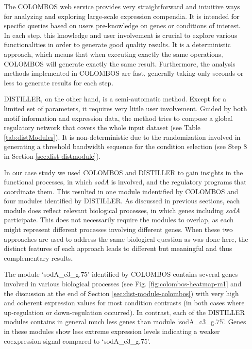 The COLOMBOS web service provides very straightforward and intuitive
ways for analyzing and exploring large-scale expression compendia. It is
intended for specific queries based on users pre-knowledge on genes or
conditions of interest. In each step, this knowledge and user
involvement is crucial to explore various functionalities in order to
generate good quality results. It is a deterministic approach, which
means that when executing exactly the same operations, COLOMBOS will
generate exactly the same result. Furthermore, the analysis methods
implemented in COLOMBOS are fast, generally taking only seconds or less
to generate results for each step.

DISTILLER, on the other hand, is a semi-automatic method. Except for a
limited set of parameters, it requires very little user 
involvement. Guided by both motif information and expression data, the
method tries to compose a global regulatory network that covers the
whole input dataset (see Table \ref{tab:distModules}). 
It is non-deterministic due to the
randomization involved in generating a threshold bandwidth sequence for
the condition selection (see Step 8 in Section \ref{sec:dist-distmodule}).

In our case study we used COLOMBOS and DISTILLER to gain insights in the
functional processes, in which \textit{sodA} is involved, and the regulatory
programs that coordinate them. This resulted in one module indentified
by COLOMBOS and four modules identified by DISTILLER. As discussed in
previous sections, each module does reflect relevant biological
processes, in which genes including \textit{sodA} participate. This does not
necessarily require the modules to overlap, as each might represent
different processes involving different genes. When these two approaches
are used to address the same biological question as was done here, the
distinct features of each approach leads to different but meaningful and
thus complementary results.  

The module `sodA\_c3\_g.75' identified by COLOMBOS contains several genes 
involved in various biological processes
(see Fig. \ref{fig:colombos-heatmap-m1} and the discussion at the end of 
Section \ref{sec:dist-module-colombos}) with very high
and coherent expression values for most condition contrasts (in both
cases where up-regulation or down-regulation occurred). In contrast,
each of the DISTILLER modules contains in general much less genes than
module `sodA\_c3\_g.75'. Genes in these modules show less extreme
expression levels indicating a weaker coexpression signal compared to
`sodA\_c3\_g.75'.  

